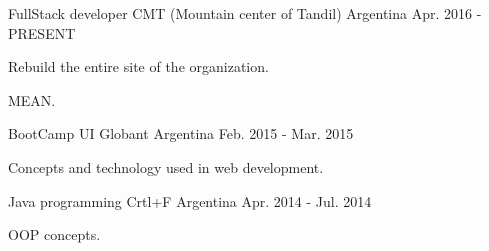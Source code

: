 


\begin{cventries}

\cventry
{FullStack developer} %
{CMT (Mountain center of Tandil)} %
{Argentina} %
{Apr. 2016 - PRESENT} %
{ %
\begin{cvitems}
\item {Rebuild the entire site of the organization.}
\item {MEAN.}
\end{cvitems}
}




\cventry
{BootCamp UI} %
{Globant} %
{Argentina} %
{Feb. 2015 - Mar. 2015} %
{ %
\begin{cvitems}
\item {Concepts and technology used in web development.}
\end{cvitems}
}


\cventry
{Java programming} %
{Crtl+F} %
{Argentina} %
{Apr. 2014 - Jul. 2014} %
{ %
\begin{cvitems}
\item {OOP concepts.}
\end{cvitems}
}


\end{cventries}
